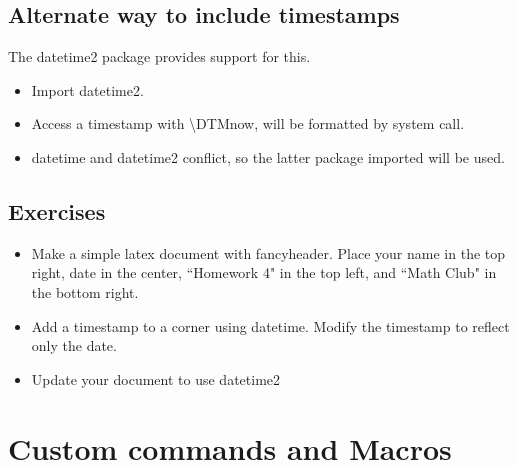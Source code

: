 \documentclass[11pt]{article}
\begin{document}
\subsection{Alternate way to include timestamps}
The datetime2 package provides support for this.
\begin{itemize}
	\item Import datetime2.
	\item Access a timestamp with \textbackslash DTMnow, will be formatted by system call. 
	\item datetime and datetime2 conflict, so the latter package imported will be used.
\end{itemize}
\subsection{Exercises}
\begin{itemize}
	\item Make a simple latex document with fancyheader. Place your name in the top right, date in the center, ``Homework 4" in the top left, and ``Math Club" in the bottom right.
	\item Add a timestamp to a corner using datetime. Modify the timestamp to reflect only the date. 
	\item Update your document to use datetime2
\end{itemize}
\section{Custom commands and Macros}
\end{document}
